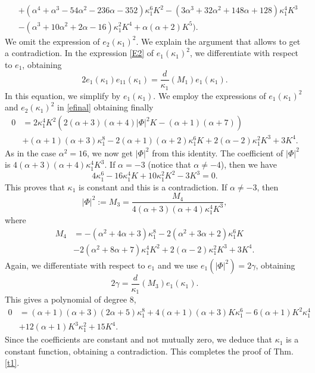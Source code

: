\documentclass[a4paper,12pt]{amsart}
\theoremstyle{definition}
\begin{document}
\begin{enumerate}
\begin{enumerate}
\begin{equation*}
\begin{split}
&+\left(\alpha ^4+\alpha ^3-54 \alpha ^2-236 \alpha -352\right) \kappa_1^6 K^2-\left(3 \alpha ^3+32 \alpha ^2+148 \alpha +128\right) \kappa_1^4 K^3\\
&-\left(\alpha ^3+10 \alpha ^2+2 \alpha -16\right) \kappa_1^2 K^4+\alpha  (\alpha +2) K^5\Big).
\end{split}
\end{equation*}
We omit the expression of $e_2(\kappa_1)^2$. We   explain the argument that allows to get a contradiction.  In the expression \eqref{E2} of $e_1(\kappa_1)^2$, we differentiate with respect to $e_1$, obtaining 
\begin{equation}\label{efinal}
2e_1(\kappa_1)e_{11}(\kappa_1)=\frac{d}{\kappa_1}(M_1)e_1(\kappa_1).
\end{equation}
In this equation, we simplify by $e_1(\kappa_1)$. We employ the expressions of $e_1(\kappa_1)^2$ and $e_2(\kappa_1)^2$ in       \eqref{efinal} obtaining finally  
\begin{equation*}
\begin{split}
0&=2 \kappa_1^4 K^2 \left(2 (\alpha +3) (\alpha +4) |\Phi|^2 K-(\alpha +1) (\alpha +7)\right)\\
&+(\alpha +1) (\alpha +3) \kappa_1^8-2 (\alpha +1) (\alpha +2) \kappa_1^6 K+2 (\alpha -2) \kappa_1^2 K^3+3 K^4.
\end{split}
\end{equation*}
As in the case $\alpha^2=16$, we now get $|\Phi|^2$ from this identity. The coefficient of $|\Phi|^2$ is $4 (\alpha +3) (\alpha +4) \kappa_1^4 K^3$. If $\alpha=-3$ (notice that $\alpha\not=-4$), then we have 
$$4 \kappa_1^6-16 \kappa_1^4 K+10 \kappa_1^2 K^2-3 K^3=0.$$
 This proves that $\kappa_1$ is constant and this is a contradiction. If $\alpha\not=-3$, then
$$|\Phi|^2:=M_3=\frac{M_4}{4 (\alpha +3) (\alpha +4) \kappa_1^4 K^3},$$
where
\begin{equation*}
\begin{split}
M_4&=- \left(\alpha ^2+4 \alpha +3\right) \kappa_1^8-2 \left(\alpha ^2+3 \alpha +2\right) \kappa_1^6 K\\
&-2 \left(\alpha ^2+8 \alpha +7\right) \kappa_1^4 K^2+2 (\alpha -2) \kappa_1^2 K^3+3 K^4.
\end{split}
\end{equation*}
Again, we differentiate with respect to $e_1$ and we use $e_1(|\Phi|^2)=2\gamma$, obtaining 
$$2\gamma=\frac{d}{\kappa_1}(M_3) e_1(\kappa_1).$$
This gives a polynomial of degree $8$, 
\begin{equation*}
\begin{split}
0&=(\alpha +1) (\alpha +3) (2 \alpha +5) \kappa_1^8+4 (\alpha +1) (\alpha +3)K \kappa_1^6 -6 (\alpha +1)K^2 \kappa_1^4 \\
&+12 (\alpha +1) K^3\kappa_1^2 +15 K^4.
\end{split}
\end{equation*}
Since the coefficients are constant and not mutually zero, we deduce that $\kappa_1$ is a constant function, obtaining a contradiction. This completes the proof of Thm. \ref{t1}.
\end{enumerate}
 
 \end{enumerate}
\end{document}
